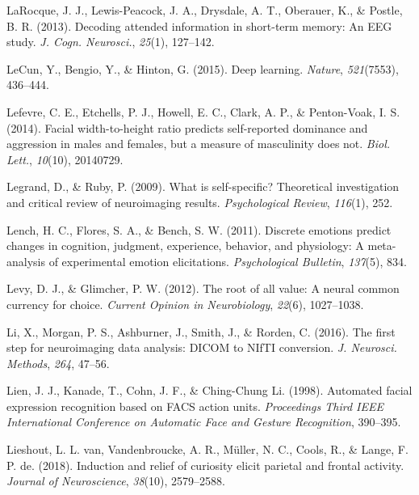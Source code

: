 \documentclass[11pt,american,]{memoir} %
\begin{document}
\leavevmode\hypertarget{ref-LaRocque2013-sh}{}%
LaRocque, J. J., Lewis-Peacock, J. A., Drysdale, A. T., Oberauer, K., \& Postle, B. R. (2013). Decoding attended information in short-term memory: An EEG study. \emph{J. Cogn. Neurosci.}, \emph{25}(1), 127--142.

\leavevmode\hypertarget{ref-LeCun2015-xa}{}%
LeCun, Y., Bengio, Y., \& Hinton, G. (2015). Deep learning. \emph{Nature}, \emph{521}(7553), 436--444.

\leavevmode\hypertarget{ref-Lefevre2014-vo}{}%
Lefevre, C. E., Etchells, P. J., Howell, E. C., Clark, A. P., \& Penton-Voak, I. S. (2014). Facial width-to-height ratio predicts self-reported dominance and aggression in males and females, but a measure of masculinity does not. \emph{Biol. Lett.}, \emph{10}(10), 20140729.

\leavevmode\hypertarget{ref-legrand2009self}{}%
Legrand, D., \& Ruby, P. (2009). What is self-specific? Theoretical investigation and critical review of neuroimaging results. \emph{Psychological Review}, \emph{116}(1), 252.

\leavevmode\hypertarget{ref-lench2011discrete}{}%
Lench, H. C., Flores, S. A., \& Bench, S. W. (2011). Discrete emotions predict changes in cognition, judgment, experience, behavior, and physiology: A meta-analysis of experimental emotion elicitations. \emph{Psychological Bulletin}, \emph{137}(5), 834.

\leavevmode\hypertarget{ref-levy2012root}{}%
Levy, D. J., \& Glimcher, P. W. (2012). The root of all value: A neural common currency for choice. \emph{Current Opinion in Neurobiology}, \emph{22}(6), 1027--1038.

\leavevmode\hypertarget{ref-Li2016-ss}{}%
Li, X., Morgan, P. S., Ashburner, J., Smith, J., \& Rorden, C. (2016). The first step for neuroimaging data analysis: DICOM to NIfTI conversion. \emph{J. Neurosci. Methods}, \emph{264}, 47--56.

\leavevmode\hypertarget{ref-Lien1998-bg}{}%
Lien, J. J., Kanade, T., Cohn, J. F., \& Ching-Chung Li. (1998). Automated facial expression recognition based on FACS action units. \emph{Proceedings Third IEEE International Conference on Automatic Face and Gesture Recognition}, 390--395.

\leavevmode\hypertarget{ref-van2018induction}{}%
Lieshout, L. L. van, Vandenbroucke, A. R., Müller, N. C., Cools, R., \& Lange, F. P. de. (2018). Induction and relief of curiosity elicit parietal and frontal activity. \emph{Journal of Neuroscience}, \emph{38}(10), 2579--2588.
\end{document}

